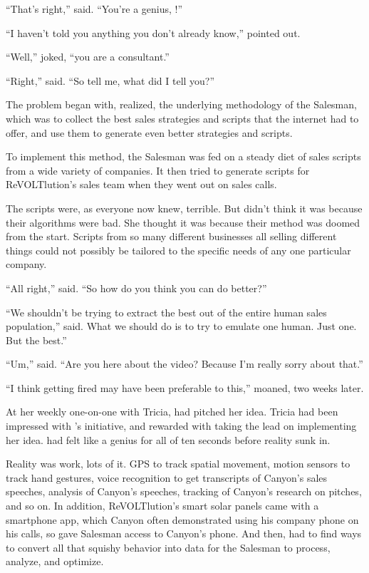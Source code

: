 ``That's right,'' {\protag} said. ``You're a genius, {\sidetag}!''

``I haven't told you anything you don't already know,'' {\sidetag} pointed out.

``Well,'' {\protag} joked, ``you are a consultant.''

``Right,'' {\sidetag} said. ``So tell me, what did I tell you?''

\bigbreak

The problem began with, {\protag} realized, the underlying methodology of the Salesman, which was to collect the best sales strategies and scripts that the internet had to offer, and use them to generate even better strategies and scripts.

To implement this method, the Salesman was fed on a steady diet of sales scripts from a wide variety of companies. It then tried to generate scripts for ReVOLTlution's sales team when they went out on sales calls.

The scripts were, as everyone now knew, terrible. But {\protag} didn't think it was because their algorithms were bad. She thought it was because their method was doomed from the start. Scripts from so many different businesses all selling different things could not possibly be tailored to the specific needs of any one particular company.

``All right,'' {\sidetag} said. ``So how do you think you can do better?''

``We shouldn't be trying to extract the best out of the entire human sales population,'' {\protag} said. What we should do is to try to emulate one human. Just one. But the best.''

\bigbreak

``Um,'' {\energyJerk} said. ``Are you here about the video? Because I'm really sorry about that.''

\bigbreak

``I think getting fired may have been preferable to this,'' {\protag} moaned, two weeks later.

At her weekly one-on-one with Tricia, {\protag} had pitched her idea. Tricia had been impressed with {\protag}'s initiative, and rewarded {\protag} with taking the lead on implementing her idea. {\protag} had felt like a genius for all of ten seconds before reality sunk in.

Reality was work, lots of it. GPS to track spatial movement, motion sensors to track hand gestures, voice recognition to get transcripts of Canyon's sales speeches, analysis of Canyon's speeches, tracking of Canyon's research on pitches, and so on. In addition, ReVOLTlution's smart solar panels came with a smartphone app, which Canyon often demonstrated using his company phone on his calls, so {\protag} gave Salesman access to Canyon's phone. And then, {\protag} had to find ways to convert all that squishy behavior into data for the Salesman to process, analyze, and optimize.

